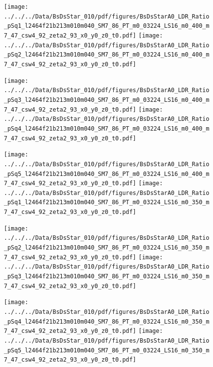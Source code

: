 \documentclass[a4paper,10pt]{article}
\begin{document}
\begin{figure}[p]
 \texttt{[image: ../../../Data/BsDsStar\_010/pdf/figures/BsDsStarA0\_LDR\_Ratio\_pSq1\_l2464f21b213m010m040\_SM7\_86\_PT\_m0\_03224\_LS16\_m0\_400\_m7\_47\_csw4\_92\_zeta2\_93\_x0\_y0\_z0\_t0.pdf]} 
 \texttt{[image: ../../../Data/BsDsStar\_010/pdf/figures/BsDsStarA0\_LDR\_Ratio\_pSq2\_l2464f21b213m010m040\_SM7\_86\_PT\_m0\_03224\_LS16\_m0\_400\_m7\_47\_csw4\_92\_zeta2\_93\_x0\_y0\_z0\_t0.pdf]} 
 \end{figure}
\begin{figure}[p]
 \texttt{[image: ../../../Data/BsDsStar\_010/pdf/figures/BsDsStarA0\_LDR\_Ratio\_pSq3\_l2464f21b213m010m040\_SM7\_86\_PT\_m0\_03224\_LS16\_m0\_400\_m7\_47\_csw4\_92\_zeta2\_93\_x0\_y0\_z0\_t0.pdf]} 
 \texttt{[image: ../../../Data/BsDsStar\_010/pdf/figures/BsDsStarA0\_LDR\_Ratio\_pSq4\_l2464f21b213m010m040\_SM7\_86\_PT\_m0\_03224\_LS16\_m0\_400\_m7\_47\_csw4\_92\_zeta2\_93\_x0\_y0\_z0\_t0.pdf]} 
 \end{figure}
\begin{figure}[p]
 \texttt{[image: ../../../Data/BsDsStar\_010/pdf/figures/BsDsStarA0\_LDR\_Ratio\_pSq5\_l2464f21b213m010m040\_SM7\_86\_PT\_m0\_03224\_LS16\_m0\_400\_m7\_47\_csw4\_92\_zeta2\_93\_x0\_y0\_z0\_t0.pdf]} 
 \texttt{[image: ../../../Data/BsDsStar\_010/pdf/figures/BsDsStarA0\_LDR\_Ratio\_pSq1\_l2464f21b213m010m040\_SM7\_86\_PT\_m0\_03224\_LS16\_m0\_350\_m7\_47\_csw4\_92\_zeta2\_93\_x0\_y0\_z0\_t0.pdf]} 
 \end{figure}
\clearpage
\begin{figure}[p]
 \texttt{[image: ../../../Data/BsDsStar\_010/pdf/figures/BsDsStarA0\_LDR\_Ratio\_pSq2\_l2464f21b213m010m040\_SM7\_86\_PT\_m0\_03224\_LS16\_m0\_350\_m7\_47\_csw4\_92\_zeta2\_93\_x0\_y0\_z0\_t0.pdf]} 
 \texttt{[image: ../../../Data/BsDsStar\_010/pdf/figures/BsDsStarA0\_LDR\_Ratio\_pSq3\_l2464f21b213m010m040\_SM7\_86\_PT\_m0\_03224\_LS16\_m0\_350\_m7\_47\_csw4\_92\_zeta2\_93\_x0\_y0\_z0\_t0.pdf]} 
 \end{figure}
\begin{figure}[p]
 \texttt{[image: ../../../Data/BsDsStar\_010/pdf/figures/BsDsStarA0\_LDR\_Ratio\_pSq4\_l2464f21b213m010m040\_SM7\_86\_PT\_m0\_03224\_LS16\_m0\_350\_m7\_47\_csw4\_92\_zeta2\_93\_x0\_y0\_z0\_t0.pdf]} 
 \texttt{[image: ../../../Data/BsDsStar\_010/pdf/figures/BsDsStarA0\_LDR\_Ratio\_pSq5\_l2464f21b213m010m040\_SM7\_86\_PT\_m0\_03224\_LS16\_m0\_350\_m7\_47\_csw4\_92\_zeta2\_93\_x0\_y0\_z0\_t0.pdf]} 
 \end{figure}
\end{document}
